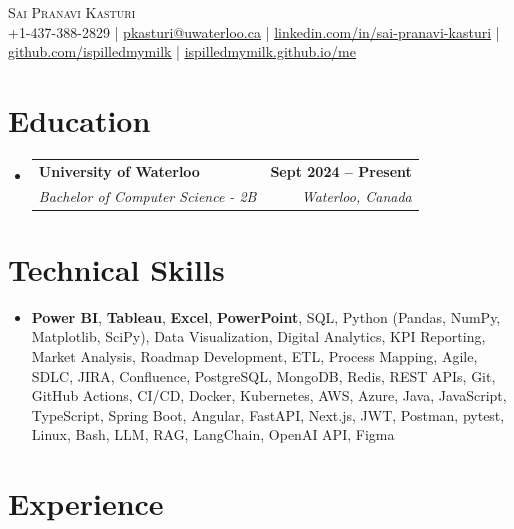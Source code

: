 \documentclass[letterpaper,10pt]{article}
\makeatletter
\newcommand{\resumeSubheading}[4]{
  \vspace{-1pt}\item
    \begin{tabular*}{1.0\textwidth}[t]{l@{\extracolsep{\fill}}r}
      \textbf{#1} & \textbf{\small #2} \\
      \textit{\small#3} & \textit{\small #4} \\[-2pt]
    \end{tabular*}\vspace{-7pt}
}
\newcommand{\resumeSubHeadingListStart}{\begin{itemize}[leftmargin=0.0in, label={}]}
\newcommand{\resumeSubHeadingListEnd}{\end{itemize}}
\makeatother
\begin{document}

\vspace{-28pt}
\begin{center}
    {\Huge \scshape Sai Pranavi Kasturi} \\ 
    
    \small +1-437-388-2829 | \underline{pkasturi@uwaterloo.ca} | \href{https://linkedin.com/in/sai-pranavi-kasturi-704807298}{\underline{linkedin.com/in/sai-pranavi-kasturi}} | \href{https://github.com/ispilledmymilk}{\underline{github.com/ispilledmymilk}} | \href{https://ispilledmymilk.github.io/me/}{\underline{ispilledmymilk.github.io/me}}
    \vspace{-10pt}
\end{center}

\vspace{-10pt}
\section{Education}
  \resumeSubHeadingListStart
    \resumeSubheading
      {University of Waterloo}{Sept 2024 -- Present}
      {Bachelor of Computer Science - 2B}{Waterloo, Canada}
  \resumeSubHeadingListEnd
\vspace{-8pt}


\section{Technical Skills}
\begin{itemize}[leftmargin=0.05in, label={}]
  \small\item{
    \textbf{Power BI}, \textbf{Tableau}, \textbf{Excel}, \textbf{PowerPoint}, SQL, Python (Pandas, NumPy, Matplotlib, SciPy), Data Visualization, Digital Analytics, KPI Reporting, Market Analysis, Roadmap Development, ETL, Process Mapping, Agile, SDLC, JIRA, Confluence, PostgreSQL, MongoDB, Redis, REST APIs, Git, GitHub Actions, CI/CD, Docker, Kubernetes, AWS, Azure, Java, JavaScript, TypeScript, Spring Boot, Angular, FastAPI, Next.js, JWT, Postman, pytest, Linux, Bash, LLM, RAG, LangChain, OpenAI API, Figma
  }
\end{itemize}
\vspace{-18pt}

\vspace{1.20pt}
\section{Experience}
\end{document}

